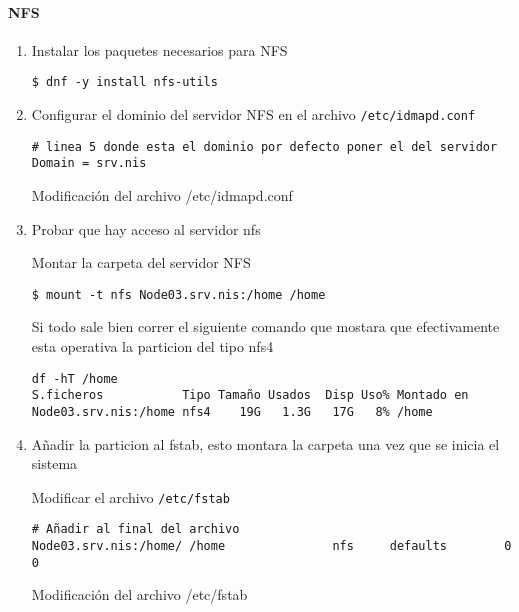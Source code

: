 \documentclass[../main.tex]{subfiles}
\begin{document}
\paragraph{NFS}
\begin{enumerate}
  \item Instalar los paquetes necesarios para NFS

        \begin{listing}[H]
\begin{verbatim}
$ dnf -y install nfs-utils
\end{verbatim}
\end{listing}
  \item Configurar el dominio del servidor NFS en el
        archivo \texttt{/etc/idmapd.conf}
        \begin{listing}[H]
\begin{verbatim}
# linea 5 donde esta el dominio por defecto poner el del servidor
Domain = srv.nis
\end{verbatim}
\label{list:idmap}
\caption{Modificación del archivo /etc/idmapd.conf}
\end{listing}

  \item Probar que hay acceso al servidor nfs

        Montar la carpeta del servidor NFS

        \begin{listing}[H]
\begin{verbatim}
$ mount -t nfs Node03.srv.nis:/home /home
\end{verbatim}
\end{listing}

        Si todo sale bien correr el siguiente comando que mostara que
        efectivamente esta operativa la particion del tipo nfs4

        \begin{listing}[H]
\begin{verbatim}
df -hT /home
S.ficheros           Tipo Tamaño Usados  Disp Uso% Montado en
Node03.srv.nis:/home nfs4    19G   1.3G   17G   8% /home
\end{verbatim}
\end{listing}

  \item Añadir la particion al fstab, esto montara la carpeta una vez
        que se inicia el sistema

        Modificar el archivo \texttt{/etc/fstab}
        \begin{listing}[H]
\begin{verbatim}
# Añadir al final del archivo
Node03.srv.nis:/home/ /home               nfs     defaults        0 0
\end{verbatim}
\label{list:fstab}
\caption{Modificación del archivo /etc/fstab}
\end{listing}


\end{enumerate}
\end{document}
